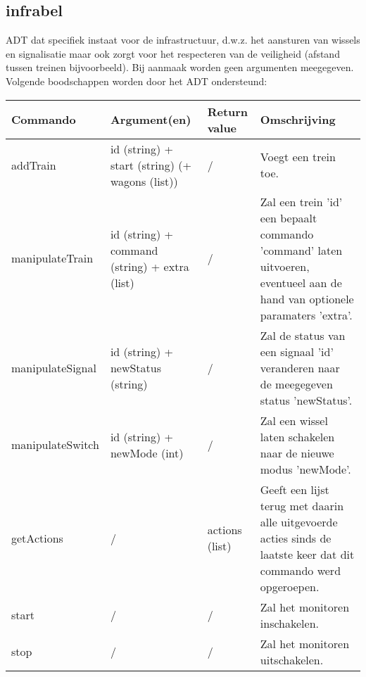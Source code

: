 \documentclass{article}
\begin{document}
\subsection{infrabel} %
ADT dat specifiek instaat voor de infrastructuur, d.w.z. het aansturen van wissels en signalisatie maar ook zorgt voor het respecteren van de veiligheid (afstand tussen treinen bijvoorbeeld). Bij aanmaak worden geen argumenten meegegeven.
Volgende boodschappen worden door het ADT ondersteund:
\begin{center}
    \begin{tabular}{ | l | p{4cm} | l | p{6cm} |}
    \hline
    Commando & Argument(en) & Return value & Omschrijving \\ \hline
    addTrain & id (string) + start (string) (+ wagons (list)) & / & Voegt een trein toe. \\ \hline
    manipulateTrain & id (string) + command (string) + extra (list) & / & Zal een trein 'id' een bepaalt commando 'command' laten uitvoeren, eventueel aan de hand van optionele paramaters 'extra'. \\ \hline
    manipulateSignal & id (string) + newStatus (string) & / & Zal de status van een signaal 'id' veranderen naar de meegegeven status 'newStatus'. \\ \hline
    manipulateSwitch & id (string) + newMode (int) & / & Zal een wissel laten schakelen naar de nieuwe modus 'newMode'. \\ \hline
    getActions & / & actions (list) & Geeft een lijst terug met daarin alle uitgevoerde acties sinds de laatste keer dat dit commando werd opgeroepen. \\ \hline
    start & / & / & Zal het monitoren inschakelen. \\ \hline
    stop & / & / & Zal het monitoren uitschakelen. \\ \hline
    \end{tabular}
\end{center}
\end{document}
